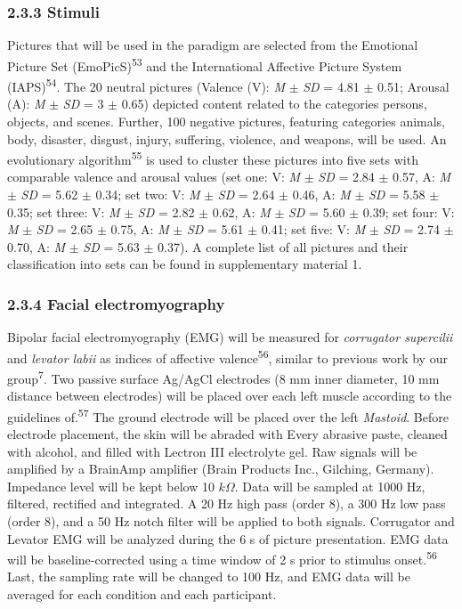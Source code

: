 \documentclass[
  english,
  man,floatsintext]{apa6}
\begin{document}
\hypertarget{stimuli}{%
\subsubsection{2.3.3 Stimuli}\label{stimuli}}

Pictures that will be used in the paradigm are selected from the Emotional Picture Set (EmoPicS)\textsuperscript{53} and the International Affective Picture System (IAPS)\textsuperscript{54}.
The 20 neutral pictures (Valence (V): \emph{M} \(\pm\) \emph{SD} = 4.81 \(\pm\) 0.51; Arousal (A): \emph{M} \(\pm\) \emph{SD} = 3 \(\pm\) 0.65) depicted content related to the categories persons, objects, and scenes.
Further, 100 negative pictures, featuring categories animals, body, disaster, disgust, injury, suffering, violence, and weapons, will be used.
An evolutionary algorithm\textsuperscript{55} is used to cluster these pictures into five sets with comparable valence and arousal values (set one: V: \emph{M} \(\pm\) \emph{SD} = 2.84 \(\pm\) 0.57, A: \emph{M} \(\pm\) \emph{SD} = 5.62 \(\pm\) 0.34; set two: V: \emph{M} \(\pm\) \emph{SD} = 2.64 \(\pm\) 0.46, A: \emph{M} \(\pm\) \emph{SD} = 5.58 \(\pm\) 0.35; set three: V: \emph{M} \(\pm\) \emph{SD} = 2.82 \(\pm\) 0.62, A: \emph{M} \(\pm\) \emph{SD} = 5.60 \(\pm\) 0.39; set four: V: \emph{M} \(\pm\) \emph{SD} = 2.65 \(\pm\) 0.75, A: \emph{M} \(\pm\) \emph{SD} = 5.61 \(\pm\) 0.41; set five: V: \emph{M} \(\pm\) \emph{SD} = 2.74 \(\pm\) 0.70, A: \emph{M} \(\pm\) \emph{SD} = 5.63 \(\pm\) 0.37).
A complete list of all pictures and their classification into sets can be found in supplementary material 1.

\hypertarget{facial-electromyography}{%
\subsubsection{2.3.4 Facial electromyography}\label{facial-electromyography}}

Bipolar facial electromyography (EMG) will be measured for \emph{corrugator supercilii} and \emph{levator labii} as indices of affective valence\textsuperscript{56}, similar to previous work by our group\textsuperscript{7}.
Two passive surface Ag/AgCl electrodes (8 mm inner diameter, 10 mm distance between electrodes) will be placed over each left muscle according to the guidelines of.\textsuperscript{57}
The ground electrode will be placed over the left \emph{Mastoid}.
Before electrode placement, the skin will be abraded with Every abrasive paste, cleaned with alcohol, and filled with Lectron III electrolyte gel.
Raw signals will be amplified by a BrainAmp amplifier (Brain Products Inc., Gilching, Germany).
Impedance level will be kept below 10 \(k\Omega\).
Data will be sampled at 1000 Hz, filtered, rectified and integrated.
A 20 Hz high pass (order 8), a 300 Hz low pass (order 8), and a 50 Hz notch filter will be applied to both signals.
Corrugator and Levator EMG will be analyzed during the 6 s of picture presentation.
EMG data will be baseline-corrected using a time window of 2 s prior to stimulus onset.\textsuperscript{56}
Last, the sampling rate will be changed to 100 Hz, and EMG data will be averaged for each condition and each participant.
\end{document}
